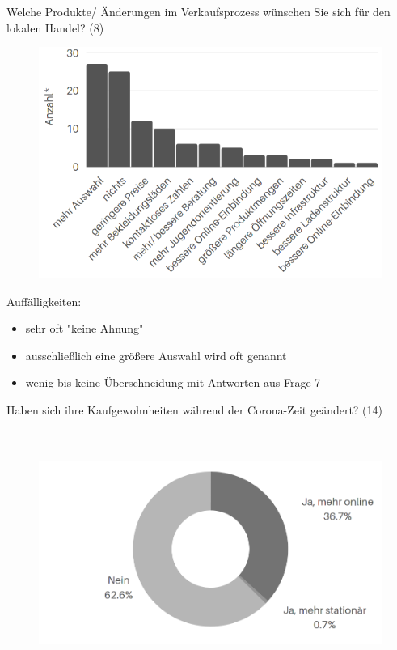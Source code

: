 \documentclass[a4paper, 12pt]{scrartcl}
\begin{document}
\newpage\noindent Welche Produkte/ Änderungen im Verkaufsprozess wünschen Sie sich für den lokalen Handel? (8)\\
\vfill
\begin{figure}[H]
    \begin{center}
        \includegraphics[width=12cm]{media/schuelerumfrage/8.png}
    \end{center} 
\end{figure}
\vfill\vfill
\noindent Auffälligkeiten:
\begin{itemize}
 \item sehr oft "keine Ahnung"
 \item ausschließlich eine größere Auswahl wird oft genannt
 \item wenig bis keine Überschneidung mit Antworten aus Frage 7
 \end{itemize}
\vfill\vfill\vfill\vfill




\newpage\noindent Haben sich ihre Kaufgewohnheiten während der Corona-Zeit geändert? (14)\\\\\\

\begin{figure}[H]
    \begin{center}
        \includegraphics[width=12cm]{media/schuelerumfrage/14.png}
    \end{center}
\end{figure}
\end{document}
